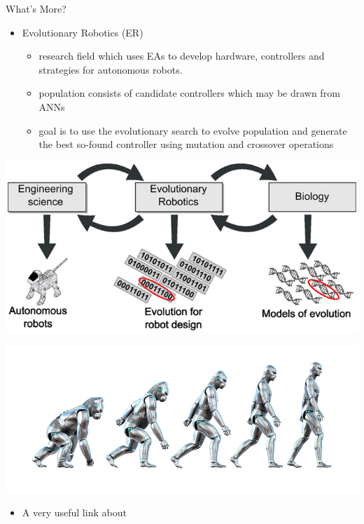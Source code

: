 \begin{frame}{What's More?}
\begin{itemize}
    \item Evolutionary Robotics (ER)
    \begin{itemize}
        \item research field which uses EAs to develop hardware, controllers and strategies for autonomous robots. 
        \item population consists of candidate controllers which may be drawn from ANNs
        \item goal is to use the evolutionary search to evolve population and generate the best so-found controller using mutation and crossover operations
    \end{itemize}
\end{itemize}
\begin{minipage}[c]{0.49\textwidth}
\includegraphics[width=\textwidth]{new_images/ER1.jpg}
\end{minipage}
\begin{minipage}[c]{0.49\textwidth}
\includegraphics[width=\textwidth]{new_images/ER2.jpg} 
\end{minipage}
\linebreak
\begin{itemize}
    \item A very useful link about 
\end{itemize}
\end{frame}

